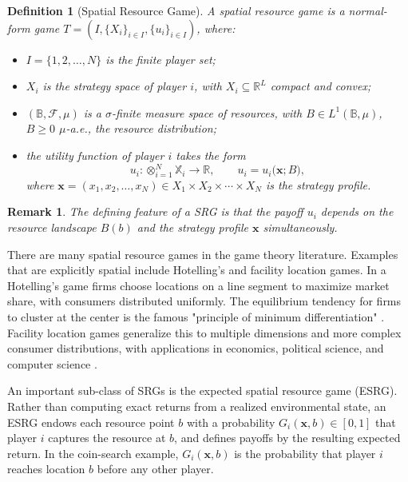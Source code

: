 \documentclass{article}
\newtheorem{definition}{Definition}
\newtheorem{remark}{Remark}
\begin{document}
            \begin{definition}[Spatial Resource Game]\label{def:SI_SRG}
                A spatial resource game is a normal-form game $T = (I,\{X_i\}_{i\in I}, \{u_i\}_{i\in I})$, where:
                \begin{itemize}
                    \item $I = \{1,2,\dots,N\}$ is the finite player set;
                     \item $X_i$ is the strategy space of player $i$, with $X_i \subseteq \mathbb{R}^L$ compact and convex;
                    \item $(\mathbb{B}, \mathcal{F}, \mu)$ is a $\sigma$-finite measure space of resources, with $B \in L^1(\mathbb{B},\mu)$, $B\geq 0$ $\mu$-a.e., the resource distribution;
                    \item the utility function of player $i$ takes the form
                    \begin{equation}
                        u_i : \otimes_{i=1}^N \mathbb{X}_i \to \mathbb{R}, \qquad
                        u_i = u_i\bigl(\mathbf{x}; B\bigr),
                    \end{equation}
                    where $\mathbf{x} = (x_1, x_2, \dots, x_N) \in X_1 \times X_2 \times \cdots \times X_N$ is the strategy profile.
                \end{itemize}
            \end{definition}
            \begin{remark}
                The defining feature of a SRG is that the payoff $u_i$ depends on the resource landscape $B(b)$ and the strategy profile $\mathbf{x}$ simultaneously.
            \end{remark}
            There are many spatial resource games in the game theory literature. Examples that are explicitly spatial include Hotelling's and facility location games. In a Hotelling's game firms choose locations on a line segment to maximize market share, with consumers distributed uniformly. The equilibrium tendency for firms to cluster at the center is the famous "principle of minimum differentiation" \cite{hotelling1929stability}. Facility location games generalize this to multiple dimensions and more complex consumer distributions, with applications in economics, political science, and computer science \cite{drezner2024competitive}.


            An important sub-class of SRGs is the expected spatial resource game (ESRG). Rather than computing exact returns from a realized environmental state, an ESRG endows each resource point $b$ with a probability $G_i(\mathbf{x}, b) \in [0,1]$ that player $i$ captures the resource at $b$, and defines payoffs by the resulting expected return. In the coin-search example, $G_i(\mathbf{x},b)$ is the probability that player $i$ reaches location $b$ before any other player.
\end{document}
